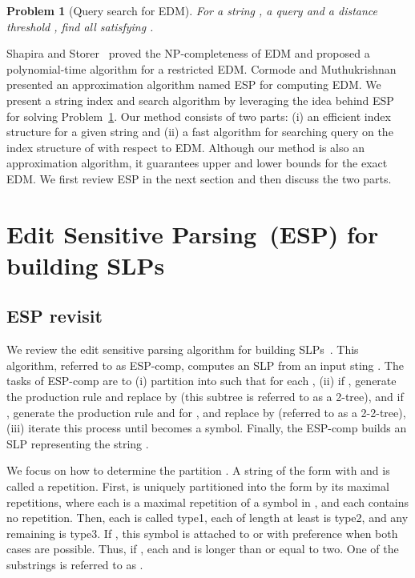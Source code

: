 \documentclass[12pt,a4paper]{scrartcl}
\newtheorem{prob}{Problem}
\begin{document}
\begin{prob}[Query search for EDM] \label{prob:1}
For a string , a query  and a distance threshold , find all  
satisfying .
\end{prob}

Shapira and Storer~\cite{Shapira07} proved the NP-completeness of EDM and
proposed a polynomial-time algorithm for a restricted EDM.
Cormode and Muthukrishnan~\cite{Cormode07} presented an approximation
algorithm named ESP for computing EDM.  We present a string index and
search algorithm by leveraging the idea behind ESP for solving Problem~\ref{prob:1}.  
Our method consists of two parts: (i) an efficient index structure for a given string  and (ii) a fast
algorithm for searching query  on the index structure of  with
respect to EDM.  Although our method is also an approximation
algorithm, it guarantees upper and lower bounds for the exact EDM.  We
first review ESP in the next section and then discuss the two parts.

\section{Edit Sensitive Parsing~(ESP) for building SLPs}

\subsection{ESP revisit}

We review the edit sensitive parsing algorithm for building SLPs~\cite{SakamotoMKS09}.
This algorithm, referred to as ESP-comp, computes an SLP from an input sting .
The tasks of ESP-comp are to (i) partition  into  such that
 for each ,
(ii) if , generate the production rule  and replace  by 
(this subtree is referred to as a 2-tree), and 
if , generate the production rule  and  for ,
and replace  by  (referred to as a 2-2-tree),
(iii) iterate this process until  becomes a symbol.
Finally, the ESP-comp builds an SLP representing the string .

We focus on how to determine the partition .
A string of the form  with  and  is called a repetition.
First,  is uniquely partitioned into the form
  by its maximal repetitions, where each  is 
a maximal repetition of a symbol in , and each  contains no repetition.
Then, each  is called type1, each  of length at least  is type2, and any remaining  is type3.
If , this symbol is attached to  or  with preference  when both cases are possible.
Thus, if , each  and  is longer than or equal to two.
One of the substrings is referred to as .
\end{document}
